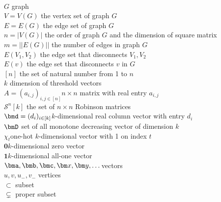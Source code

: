 

\begin{abstract}
This is but a ``speech draft'' written by Zhiyuan Zhang (Owen) (he/him/his) for preparing for future potential teaching/lecturing positions.
\end{abstract}


 \\ 
$G$ \dotfill graph\\
$V = V(G)$ \dotfill the vertex set of graph $G$\\
$E = E(G)$ \dotfill the edge set of graph $G$\\
$n = |V(G)|$ \dotfill the order of graph $ G $ and the dimension of square matrix\\
$m = ||E(G)||$ \dotfill the number of edges in graph $G$\\
$E(V_1, V_2)$ \dotfill{} the edge set that disconnects $V_1, V_2$ \\
$E(v)$ \dotfill{} the edge set that disconnects $v$ in $G$ \\
$[n]$ \dotfill the set of natural number from 1 to $n$\\
$k$ \dotfill dimension of threshold vectors\\
$A = (a_{i,j})_{i,j\in[n]}$\dotfill $n\times n$ matrix with real entry $a_{i,j}$\\
$\mathcal S^n[k]$ \dotfill the set of $n\times n$ Robinson matrices\\
$\bmd = (d_{i})_{i\in[k]}$\dotfill $k$-dimensional real column vector with entry $d_{i}$\\
$\bmD$ \dotfill set of all monotone decreasing vector of dimension $k$\\
$\chi_t$\dotfill one-hot $k$-dimensional vector with 1 on index $t$\\
$\bm 0$\dotfill $k$-dimensional zero vector\\
$\bm 1$\dotfill $k$-dimensional all-one vector\\
$\bma, \bmb, \bmc, \bm x, \bm y, \dots$\dotfill vectors\\ 
$u,v, u_-, v_-$ \dotfill vertices\\
$\subset$ \dotfill subset\\
$\subsetneq$ \dotfill proper subset
